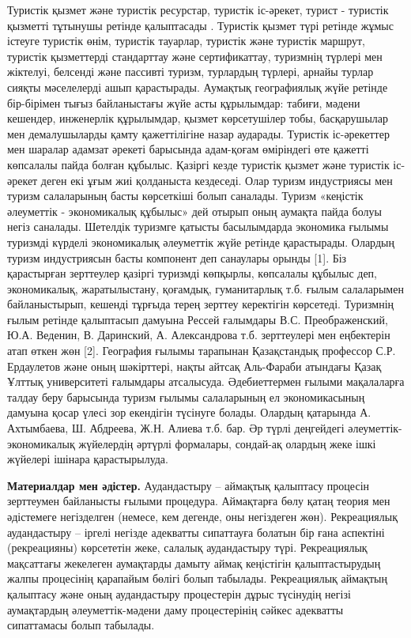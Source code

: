Туристік қызмет және туристік ресурстар, туристік іс-әрекет, турист -
туристік қызметті тұтынушы ретінде қалыптасады . Туристік қызмет түрі
ретінде жұмыс істеуге туристік өнім, туристік тауарлар, туристік және
туристік маршрут, туристік қызметтерді стандарттау және сертификаттау,
туризмнің түрлері мен жіктелуі, белсенді және пассивті туризм, турлардың
түрлері, арнайы турлар сияқты мәселелерді ашып қарастырады. Аумақтық
географиялық жүйе ретінде бір-бірімен тығыз байланыстағы жүйе асты
құрылымдар: табиғи, мәдени кешендер, инженерлік құрылымдар, қызмет
көрсетушілер тобы, басқарушылар мен демалушыларды қамту қажеттілігіне
назар аударады. Туристік іс-әрекеттер мен шаралар адамзат әрекеті
барысында адам-қоғам өміріндегі өте қажетті көпсалалы пайда болған
құбылыс. Қазіргі кезде туристік қызмет және туристік іс-әрекет деген екі
ұғым жиі қолданыста кездеседі. Олар туризм индустриясы мен туризм
салаларының басты көрсеткіші болып саналады. Туризм «кеңістік әлеуметтік
- экономикалық құбылыс» дей отырып оның аумақта пайда болуы негіз
саналады. Шетелдік туризмге қатысты басылымдарда экономика ғылымы
туризмді күрделі экономикалық әлеуметтік жүйе ретінде қарастырады.
Олардың туризм индустриясын басты компонент деп санаулары орынды
{[}1{]}. Біз қарастырған зерттеулер қазіргі туризмді көпқырлы, көпсалалы
құбылыс деп, экономикалық, жаратылыстану, қоғамдық, гуманитарлық т.б.
ғылым салаларымен байланыстырып, кешенді тұрғыда терең зерттеу
керектігін көрсетеді. Туризмнің ғылым ретінде қалыптасып дамуына Рессей
ғалымдары В.С. Преображенский, Ю.А. Веденин, В. Даринский, А.
Александрова т.б. зерттеулері мен еңбектерін атап өткен жөн {[}2{]}.
География ғылымы тарапынан Қазақстандық профессор С.Р. Ердаулетов және
оның шәкірттері, нақты айтсақ Аль-Фараби атындағы Қазақ Ұлттық
университеті ғалымдары атсалысуда. Әдебиеттермен ғылыми мақалаларға
талдау беру барысында туризм ғылымы салаларының ел экономикасының
дамуына қосар үлесі зор екендігін түсінуге болады. Олардың қатарында А.
Ахтымбаева, Ш. Абдреева, Ж.Н. Алиева т.б. бар. Әр түрлі деңгейдегі
әлеуметтік-экономикалық жүйелердің әртүрлі формалары, сондай-ақ олардың
жеке ішкі жүйелері ішінара қарастырылуда.

{\bfseries Материалдар мен әдістер.} Аудандастыру -- аймақтық қалыптасу
процесін зерттеумен байланысты ғылыми процедура. Аймақтарға бөлу қатаң
теория мен әдістемеге негізделген (немесе, кем дегенде, оны негіздеген
жөн). Рекреациялық аудандастыру -- іргелі негізде адекватты сипаттауға
болатын бір ғана аспектіні (рекреацияны) көрсететін жеке, салалық
аудандастыру түрі. Рекреациялық мақсаттағы жекелеген аумақтарды дамыту
аймақ кеңістігін қалыптастырудың жалпы процесінің қарапайым бөлігі болып
табылады. Рекреациялық аймақтың қалыптасу және оның аудандастыру
процестерін дұрыс түсінудің негізі аумақтардың әлеуметтік-мәдени даму
процестерінің сәйкес адекватты сипаттамасы болып табылады.

